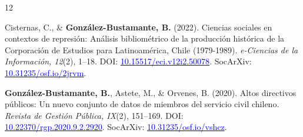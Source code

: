 \begin{publications}
\begin{benumerate}{12}
\item{Cisternas, C., \& {\bfseries González-Bustamante, B.} (2022). Ciencias sociales en contextos de represión: Análisis bibliométrico de la producción histórica de la Corporación de Estudios para Latinoamérica, Chile (1979-1989). {\itshape e-Ciencias de la Información, 12}(2), 1--18. DOI: \href{https://doi.org/10.15517/eci.v12i2.50078}{\textcolor{blue}{10.15517/eci.v12i2.50078}}. SocArXiv: \href{https://doi.org/10.31235/osf.io/2jrvm}{\textcolor{blue}{10.31235/osf.io/2jrvm}}.}\vspace{1mm} %


\item{{\bfseries González-Bustamante, B.}, Astete, M., \& Orvenes, B. (2020). Altos directivos públicos: Un nuevo conjunto de datos de miembros del servicio civil chileno. {\itshape Revista de Gestión Pública, IX}(2), 151--169. DOI: \\ \href{https://doi.org/10.22370/rgp.2020.9.2.2920}{\textcolor{blue}{10.22370/rgp.2020.9.2.2920}}. SocArXiv: \href{https://doi.org/10.31235/osf.io/vshcz}{\textcolor{blue}{10.31235/osf.io/vshcz}}.}\vspace{1mm}



\end{benumerate}
\end{publications}

